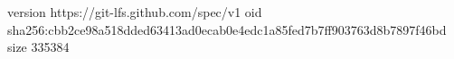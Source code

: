 version https://git-lfs.github.com/spec/v1
oid sha256:cbb2ce98a518dded63413ad0ecab0e4edc1a85fed7b7ff903763d8b7897f46bd
size 335384
